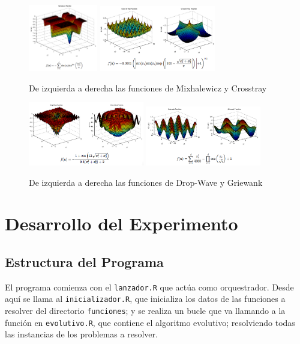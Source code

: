 \documentclass{article}
\begin{document}
\begin{figure}[h!]
\centering
\includegraphics[width=0.27\textwidth]{../imagenes/mixhalewicz}
\includegraphics[width=0.45\textwidth]{../imagenes/crosstray}
\caption{De izquierda a derecha las funciones de Mixhalewicz y Crosstray}
\end{figure}
\begin{figure}[h!]
\centering
\includegraphics[width=0.45\textwidth]{../imagenes/dropwave}
\includegraphics[width=0.45\textwidth]{../imagenes/griewank}
\caption{De izquierda a derecha las funciones de Drop-Wave y Griewank}
\end{figure}

\newpage

\section{Desarrollo del Experimento}

\subsection{Estructura del Programa}
El programa comienza con el \texttt{lanzador.R} que actúa como orquestrador. Desde aquí se llama al \texttt{inicializador.R}, que inicializa los datos de las funciones a resolver del directorio \texttt{funciones}; y se realiza un bucle que va llamando a la función en \texttt{evolutivo.R}, que contiene el algoritmo evolutivo; resolviendo todas las instancias de los problemas a resolver.
\end{document}
